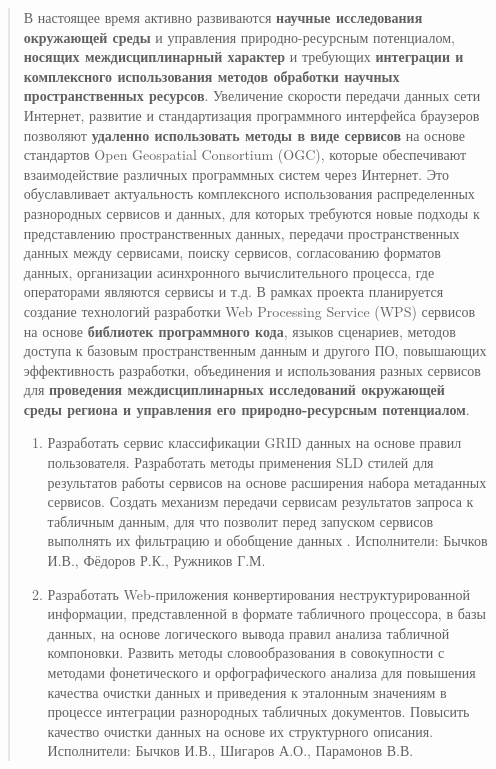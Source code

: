 \documentclass[12pt,a4paper]{ltxdoc}
\begin{document}
\begin{quote}
В настоящее время активно развиваются \textbf{научные исследования окружающей среды} и управления природно-ресурсным потенциалом, \textbf{носящих междисциплинарный характер} и требующих \textbf{интеграции и комплексного использования методов обработки научных пространственных ресурсов}. Увеличение скорости передачи данных сети Интернет, развитие и стандартизация программного интерфейса браузеров позволяют \textbf{удаленно использовать методы в виде сервисов} на основе стандартов Open Geospatial Consortium (OGC), которые обеспечивают взаимодействие различных программных систем через Интернет. Это обуславливает актуальность комплексного использования распределенных разнородных сервисов и данных, для которых требуются новые подходы к представлению пространственных данных, передачи пространственных данных между сервисами, поиску сервисов, согласованию форматов данных, организации асинхронного вычислительного процесса, где операторами являются сервисы и т.д. В рамках проекта планируется создание технологий разработки Web Processing Service (WPS) сервисов на основе\textbf{ библиотек программного кода}, языков сценариев, методов доступа к базовым пространственным данным и другого ПО, повышающих эффективность разработки, объединения и использования разных сервисов для \textbf{проведения междисциплинарных исследований окружающей среды региона и управления его природно-ресурсным потенциалом}.

\begin{enumerate}
\item Разработать сервис классификации GRID данных на основе правил пользователя. Разработать методы применения SLD стилей для результатов работы сервисов на основе расширения набора метаданных сервисов. Создать механизм передачи сервисам результатов запроса к табличным данным, для что позволит перед запуском сервисов выполнять их фильтрацию и обобщение данных . Исполнители: Бычков И.В., Фёдоров Р.К., Ружников Г.М.

\item Разработать Web-приложения конвертирования неструктурированной информации, представленной в формате табличного процессора, в базы данных, на основе логического вывода правил анализа табличной компоновки. Развить методы словообразования в совокупности с методами фонетического и орфографического анализа для повышения качества очистки данных и приведения к эталонным значениям в процессе интеграции разнородных табличных документов. Повысить качество очистки данных на основе их структурного описания. Исполнители: Бычков И.В., Шигаров А.О., Парамонов В.В.


\end{enumerate}
\end{quote}
\end{document}
